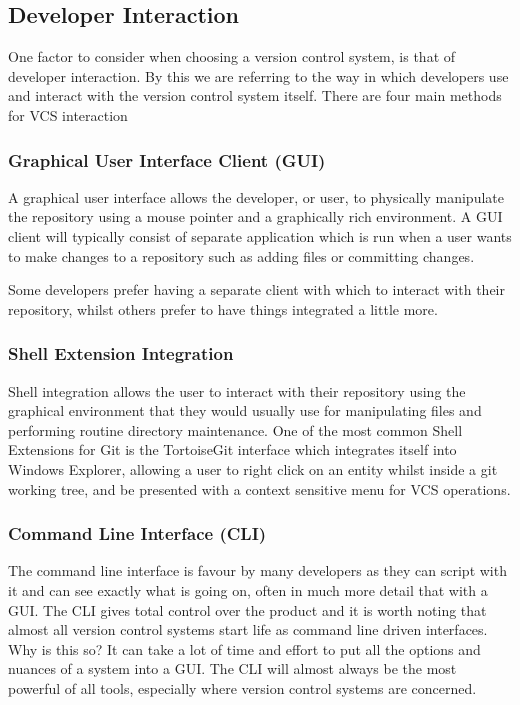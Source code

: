\subsection{Developer Interaction}

One factor to consider when choosing a version control system, is that of developer interaction.  By this we are referring to the way in which developers use and interact with the version control system itself.  There are four main methods for VCS interaction

\subsubsection{Graphical User Interface Client (GUI)}

A graphical user interface allows the developer, or user, to physically manipulate the repository using a mouse pointer and a graphically rich environment.  A GUI client will typically consist of separate application which is run when a user wants to make changes to a repository such as adding files or committing changes.  

Some developers prefer having a separate client with which to interact with their repository, whilst others prefer to have things integrated a little more.

\subsubsection{Shell Extension Integration}

Shell integration allows the user to interact with their repository using the graphical environment that they would usually use for manipulating files and performing routine directory maintenance.  One of the most common Shell Extensions for Git is the TortoiseGit interface which integrates itself into Windows Explorer, allowing a user to right click on an entity whilst inside a git working tree, and be presented with a context sensitive menu for VCS operations.

\subsubsection{Command Line Interface (CLI)}

The command line interface is favour by many developers as they can script with it and can see exactly what is going on, often in much more detail that with a GUI.  The CLI gives total control over the product and it is worth noting that almost all version control systems start life as command line driven interfaces.  Why is this so?  It can take a lot of time and effort to put all the options and nuances of a system into a GUI.  The CLI will almost always be the most powerful of all tools, especially where version control systems are concerned.


